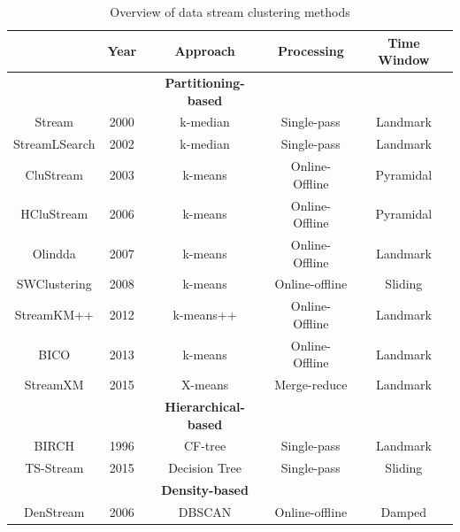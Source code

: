 \begin{table}[h]
    \centering
    \caption{ Overview of data stream clustering methods \protect\cite{mansalis2018evaluation}}
    \label{landmarkwin}
    \small
    \begin{tabular}{c c c c c}
    \hline
      \normalsize{\textbf{Algorithms} & \textbf{Year} & \textbf{ Approach } & \textbf{Processing} & \textbf{ Time Window}}  \\
     \hline \midrule
      \rowcolor{lightgray}& &\rowcolor{lightgray}\centering \textbf{Partitioning-based }  & &  \\
      \hline 
      \hline
      Stream             &   2000    &   k-median     &  Single-pass       & Landmark \\
     \hline
      StreamLSearch      &   2002    &   k-median     &   Single-pass      & Landmark \\
    \hline
     CluStream           &   2003    &  k-means       &  Online-Offline    & Pyramidal \\
    \hline   
     HCluStream         &    2006   &    k-means     & Online-Offline      & Pyramidal \\
    \hline
     Olindda            &   2007    &   k-means      &   Online-Offline    & Landmark  \\
    \hline    
     SWClustering        &    2008   &    k-means     &  Online-offline    & Sliding   \\
       \hline
      StreamKM++         &    2012   &   k-means++    & Online-Offline     & Landmark   \\
    \hline 
      BICO               &    2013   &    k-means     &  Online-Offline    & Landmark  \\
      \hline
      StreamXM           &    2015   &    X-means     &  Merge-reduce    & Landmark  \\
        \hline
      \hline
       \rowcolor{lightgray}&& \rowcolor{lightgray}\centering\textbf{Hierarchical-based }  & &  \\
      \hline 
      \hline 
      BIRCH             &    1996        &     CF-tree           &  Single-pass    & Landmark \\
     \hline
      TS-Stream         &     2015       &    Decision Tree      & Single-pass     & Sliding  \\
      \hline
      \hline
     \rowcolor{lightgray}& &\rowcolor{lightgray}\centering \textbf{Density-based}  & &  \\
      \hline 
      \hline
    DenStream            &    2006     &    DBSCAN       & Online-offline  &   Damped   \\

\end{tabular}
\end{table}
